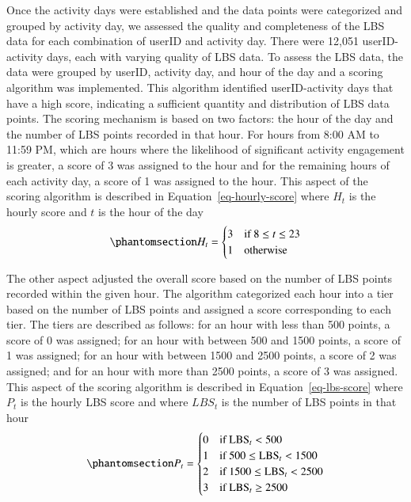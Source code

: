 \documentclass[
  letterpaper,
  number,
  review,
  3p]{elsarticle}
\begin{document}
Once the activity days were established and the data points were
categorized and grouped by activity day, we assessed the quality and
completeness of the LBS data for each combination of userID and activity
day. There were 12,051 userID-activity days, each with varying quality
of LBS data. To assess the LBS data, the data were grouped by userID,
activity day, and hour of the day and a scoring algorithm was
implemented. This algorithm identified userID-activity days that have a
high score, indicating a sufficient quantity and distribution of LBS
data points. The scoring mechanism is based on two factors: the hour of
the day and the number of LBS points recorded in that hour. For hours
from 8:00 AM to 11:59 PM, which are hours where the likelihood of
significant activity engagement is greater, a score of 3 was assigned to
the hour and for the remaining hours of each activity day, a score of 1
was assigned to the hour. This aspect of the scoring algorithm is
described in Equation~\ref{eq-hourly-score} where \(H_t\) is the hourly
score and \(t\) is the hour of the day
\begin{equation}\phantomsection\label{eq-hourly-score}{
H_t = \begin{cases} 
3 & \text{if } 8 \leq t \leq 23 \\
1 & \text{otherwise}
\end{cases}
}\end{equation}

The other aspect adjusted the overall score based on the number of LBS
points recorded within the given hour. The algorithm categorized each
hour into a tier based on the number of LBS points and assigned a score
corresponding to each tier. The tiers are described as follows: for an
hour with less than 500 points, a score of 0 was assigned; for an hour
with between 500 and 1500 points, a score of 1 was assigned; for an hour
with between 1500 and 2500 points, a score of 2 was assigned; and for an
hour with more than 2500 points, a score of 3 was assigned. This aspect
of the scoring algorithm is described in Equation~\ref{eq-lbs-score}
where \(P_t\) is the hourly LBS score and where \(LBS_t\) is the number
of LBS points in that hour
\begin{equation}\phantomsection\label{eq-lbs-score}{
P_t = 
\begin{cases} 
0 & \text{if } \text{LBS}_t < 500 \\
1 & \text{if } 500 \leq \text{LBS}_t < 1500 \\
2 & \text{if } 1500 \leq \text{LBS}_t < 2500 \\
3 & \text{if } \text{LBS}_t \geq 2500 
\end{cases}
}\end{equation}
\end{document}
